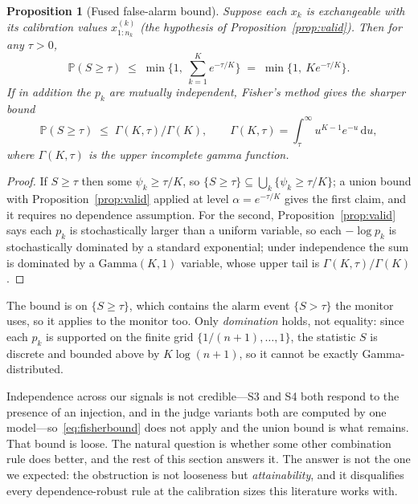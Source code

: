\documentclass[preprint,12pt,authoryear]{elsarticle}
\newtheorem{proposition}[theorem]{Proposition}
\theoremstyle{definition}
\newcommand{\Prob}{\mathbb{P}}
\begin{document}
\begin{proposition}[Fused false-alarm bound]\label{prop:fusebound}
Suppose each $x_k$ is exchangeable with its calibration values
$x^{(k)}_{1:n_k}$ (the hypothesis of Proposition~\ref{prop:valid}). Then for any
$\tau > 0$,
\begin{equation}
\Prob(S \ge \tau) \;\le\; \min\Big\{1,\ \sum_{k=1}^{K} e^{-\tau/K} \Big\}
\;=\; \min\{1,\ K e^{-\tau/K}\}.
\end{equation}
If in addition the $p_k$ are mutually independent, Fisher's method gives the
sharper bound
\begin{equation}\label{eq:fisherbound}
\Prob(S \ge \tau) \;\le\; \Gamma(K,\tau)/\Gamma(K),
\qquad
\Gamma(K,\tau) = \int_\tau^\infty u^{K-1}e^{-u}\,\mathrm{d}u ,
\end{equation}
where $\Gamma(K,\tau)$ is the upper incomplete gamma function.
\end{proposition}

\begin{proof}
If $S \ge \tau$ then some $\psi_k \ge \tau/K$, so
$\{S \ge \tau\} \subseteq \bigcup_k \{\psi_k \ge \tau/K\}$; a union bound with
Proposition~\ref{prop:valid} applied at level $\alpha = e^{-\tau/K}$ gives the
first claim, and it requires no dependence assumption. For the second,
Proposition~\ref{prop:valid} says each $p_k$ is stochastically larger than a
uniform variable, so each $-\log p_k$ is stochastically dominated by a standard
exponential; under independence the sum is dominated by a $\mathrm{Gamma}(K,1)$
variable, whose upper tail is $\Gamma(K,\tau)/\Gamma(K)$.
\end{proof}

The bound is on $\{S \ge \tau\}$, which contains the alarm event $\{S > \tau\}$ the
monitor uses, so it applies to the monitor too.
Only \emph{domination} holds, not equality: since each $p_k$ is supported on the
finite grid $\{1/(n{+}1),\dots,1\}$, the statistic $S$ is discrete and bounded
above by $K\log(n{+}1)$, so it cannot be exactly Gamma-distributed.

Independence across our signals is not credible---S3 and S4 both respond to the
presence of an injection, and in the judge variants both are computed by one
model---so~\eqref{eq:fisherbound} does not apply and the union bound is what
remains. That bound is loose. The natural question is whether some other
combination rule does better, and the rest of this section answers it. The answer
is not the one we expected: the obstruction is not looseness but
\emph{attainability}, and it disqualifies every dependence-robust rule at the
calibration sizes this literature works with.
\end{document}
